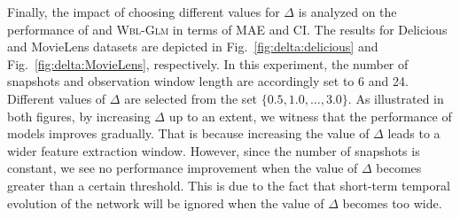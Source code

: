 Finally, the impact of choosing different values for $\Delta$ is analyzed on the performance of \npglm and \textsc{Wbl-Glm} in terms of MAE and CI. The results for Delicious and MovieLens datasets are depicted in Fig.~\ref{fig:delta:delicious} and Fig.~\ref{fig:delta:MovieLens}, respectively. In this experiment, the number of snapshots and observation window length are accordingly set to 6 and 24. Different values of $\Delta$ are selected from the set $\{0.5,1.0,\dots,3.0\}$. As illustrated in both figures, by increasing  $\Delta$ up to an extent, we witness that the performance of models improves gradually. That is because increasing the value of $\Delta$ leads to a wider feature extraction window. However, since the number of snapshots is constant, we see no performance improvement when the value of $\Delta$ becomes greater than a certain threshold. This is due to the fact that short-term temporal evolution of the network will be ignored when the value of $\Delta$ becomes too wide.
 



